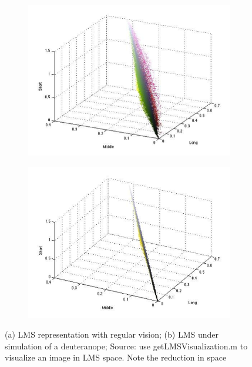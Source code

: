 \documentclass[10pt,twocolumn,letterpaper]{article}
\begin{document}
\begin{figure}[h]
  \centering
  \begin{subfigure}{0.22\textwidth}
    \includegraphics[width=\textwidth]{gamut1.png}
    \caption{}
  \end{subfigure}
  \begin{subfigure}{0.22\textwidth}
    \includegraphics[width=\textwidth]{gamut2.png}
    \caption{}
  \end{subfigure}
  \caption{(a) LMS representation with regular vision; (b) LMS under simulation of a deuteranope; Source: use getLMSVisualization.m to visualize an image in LMS space. Note the reduction in space}
  \label{fig:gamut}
\end{figure}
\end{document}
